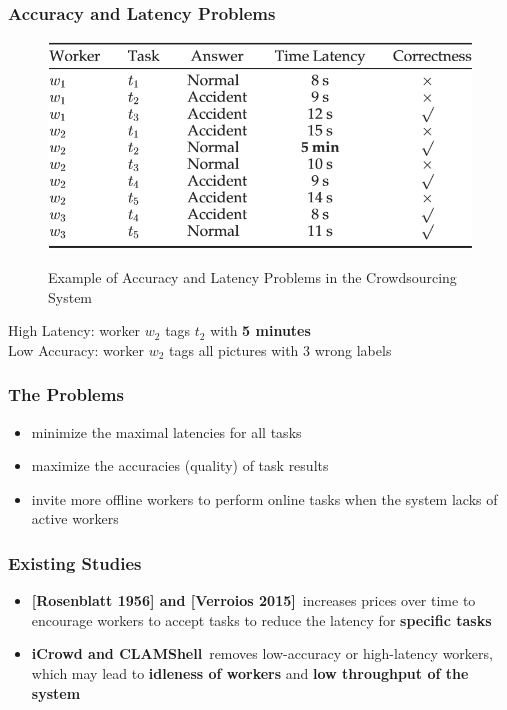 \documentclass[UTF8]{beamer}
\begin{document}
\begin{frame}
    \frametitle{Accuracy and Latency Problems}
    \begin{figure}
        \includegraphics[width= 0.8\linewidth]{ACEXP.png}
        \label{fig:ACEXP}
        \caption{Example of Accuracy and Latency Problems in the Crowdsourcing System}
     \end{figure}
     \begin{center}
         High Latency: worker $w_2$ tags $t_2$ with \textbf{5 minutes}\\
         Low Accuracy: worker $w_2$ tags all pictures with 3 wrong labels
     \end{center}
\end{frame}

\begin{frame}
    \frametitle{The Problems}
    \begin{itemize}
        \item minimize the maximal latencies for all tasks
        \item maximize the accuracies (quality) of task results
        \item invite more offline workers to perform online tasks 
        when the system lacks of active workers
    \end{itemize}
\end{frame}

\begin{frame}
    \frametitle{Existing Studies}
    \begin{itemize}
        \item \textbf{[Rosenblatt 1956] and [Verroios 2015]}\ increases 
        prices over time to encourage workers to accept tasks
        to reduce the latency for \textbf{speciﬁc tasks}
        \item \textbf{iCrowd and CLAMShell}\ removes 
        low-accuracy or high-latency workers, which may lead 
        to \textbf{idleness of workers} and \textbf{low throughput of the 
        system}
    \end{itemize}
\end{frame}
\end{document}
